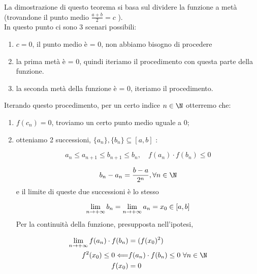 \documentclass[../analisi.tex]{subfiles}
\begin{document}
\begin{dimo}
La dimostrazione di questo teorema si basa sul dividere la funzione a metà 
(trovandone il punto medio $ \frac{a+b}{2} = c$ ).\\
In questo punto ci sono 3 scenari possibili:

\begin{enumerate}
	\item $c = 0$, il punto medio è = 0, non abbiamo bisogno di procedere
	\item la prima metà è = 0, quindi iteriamo il procedimento con questa
		parte della funzione.
	\item la seconda metà della funzione è = 0, iteriamo il procedimento.
\end{enumerate}
Iterando questo procedimento, per un certo indice $n \in \N$ otterremo che:

\begin{enumerate}
	\item  $f(c_n) = 0$, troviamo un certo punto medio uguale a 0;
	\item otteniamo 2 successioni, $\{ a_n \}, \{ b_n \} \subseteq
		[a,b]$ :

		\begin{equation}
			a_n \leq a_{n+1} \leq b_{n+1} \leq b_n, \quad
			f(a_n) \cdot f(b_n) \leq 0
		\end{equation}

		\begin{equation}
			b_n - a_n = \frac{b - a}{2^n}, \forall n \in \N 
		\end{equation}
		e il limite di queste due successioni è lo stesso

		\begin{equation}
			\lim \limits_{n \to + \infty} b_n = 
			\lim \limits_{n \to + \infty} a_n = x_0 \in [a,b]
		\end{equation}
		Per la continuità della funzione, presupposta nell'ipotesi,
	
		\begin{equation}
			\begin{aligned}
			\lim \limits_{\nti} f (a_n) \cdot f(b_n) &= (f(x_0)^2)\\
			f^2 (x_0) \leq 0 \Longleftarrow
			&f(a_n) \cdot f(b_n) \leq 0\ \forall n \in \N\\
			f(x_0) &=0
			\end{aligned}
		\end{equation}
\end{enumerate}
\end{dimo}
\end{document}
